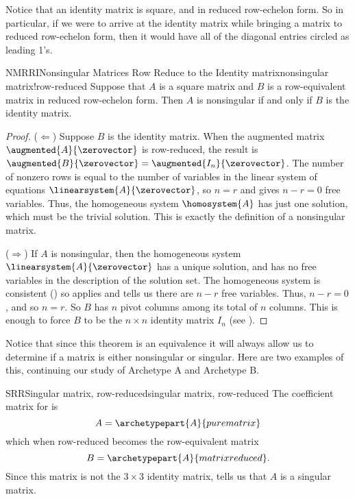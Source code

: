 %
Notice that an identity matrix is square, and in reduced row-echelon form.  So in particular, if we were to arrive at the identity matrix while bringing a matrix to reduced row-echelon form, then it would have all of the diagonal entries circled as leading 1's.
%
\begin{theorem}{NMRRI}{Nonsingular Matrices Row Reduce to the Identity matrix}{nonsingular matrix!row-reduced}
Suppose that $A$ is a square matrix and $B$ is a row-equivalent matrix in reduced row-echelon form.  Then $A$ is nonsingular if and only if $B$ is the identity matrix.
\end{theorem}
%
\begin{proof}
($\Leftarrow$)  Suppose $B$ is the identity matrix.  When the augmented matrix $\augmented{A}{\zerovector}$ is row-reduced, the result is $\augmented{B}{\zerovector}=\augmented{I_n}{\zerovector}$.  The number of nonzero rows is equal to the number of variables in the linear system of equations $\linearsystem{A}{\zerovector}$, so $n=r$ and  gives $n-r=0$ free variables.  Thus, the homogeneous system $\homosystem{A}$ has just one solution, which must be the trivial solution.  This is exactly the definition of a nonsingular matrix.\par
%
($\Rightarrow$)  If $A$ is nonsingular, then the homogeneous system $\linearsystem{A}{\zerovector}$ has a unique solution, and has no free variables in the description of the solution set.  The homogeneous system is consistent () so   applies and tells us there are $n-r$ free variables.  Thus, $n-r=0$, and so $n=r$.  So $B$ has $n$ pivot columns among its total of $n$ columns.  This is enough to force $B$ to be the $n\times n$ identity matrix $I_n$ (see ).
\end{proof}
%
Notice that since this theorem is an equivalence it will always allow us to determine if a matrix is either nonsingular or singular.  Here are two examples of this, continuing our study of Archetype A and Archetype B.
%
\begin{example}{SRR}{Singular matrix, row-reduced}{singular matrix, row-reduced}
The coefficient matrix for  is
%
\begin{equation*}
A=\archetypepart{A}{purematrix}
\end{equation*}
%
which when row-reduced becomes the row-equivalent matrix
%
\begin{equation*}
B=\archetypepart{A}{matrixreduced}.
\end{equation*}
%
Since this matrix is not the $3\times 3$ identity matrix,  tells us that $A$ is a singular matrix.
\end{example}

